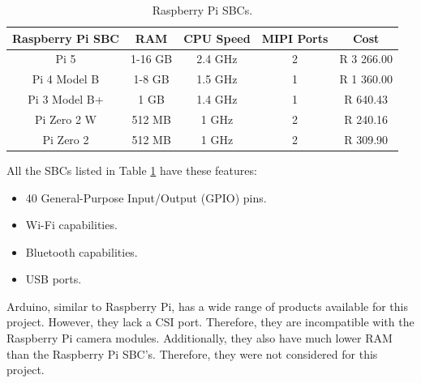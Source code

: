 \begin{table}[H]
    \centering
    \caption{Raspberry Pi SBCs. \citep{RP-P}}
    \begin{tabular}{|c|c|c|c|c|}
    \hline
        Raspberry Pi SBC & RAM & CPU Speed & MIPI Ports & Cost \\
    \hline
        Pi 5 & 1-16 GB & 2.4 GHz & 2 & R 3 266.00\\
    \hline
        Pi 4 Model B & 1-8 GB & 1.5 GHz & 1 & R 1 360.00\\
    \hline
        Pi 3 Model B+ & 1 GB & 1.4 GHz & 1 & R 640.43\\
    \hline
        Pi Zero 2 W & 512 MB & 1 GHz & 2 & R 240.16 \\ 
    \hline
        Pi Zero 2 & 512 MB & 1 GHz & 2 & R 309.90 \\ 
    \hline
    \end{tabular}
    \label{tab:Raspberry Pi SBC}
\end{table}

All the SBCs listed in Table \ref{tab:Raspberry Pi SBC} have these features:

\begin{itemize}
    \item 40 General-Purpose Input/Output (GPIO) pins.
    \item Wi-Fi capabilities.
    \item Bluetooth capabilities.
    \item USB ports.
\end{itemize}

Arduino, similar to Raspberry Pi, has a wide range of products available for this project. However, they lack a CSI port. Therefore, they are incompatible with the Raspberry Pi camera modules. Additionally, they also have much lower RAM than the Raspberry Pi SBC's. Therefore, they were not considered for this project.  \citep{GH-AA}


